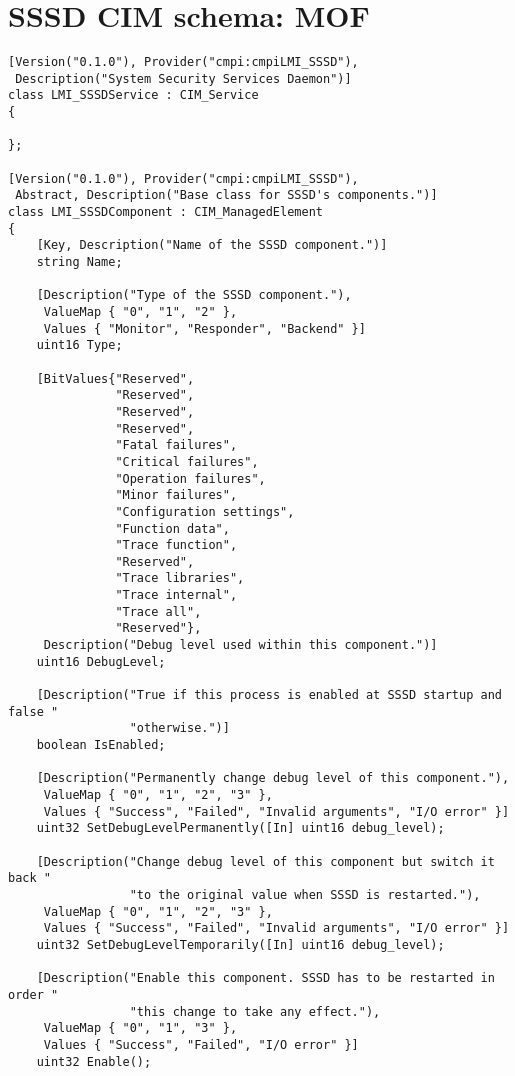 \chapter{SSSD CIM schema: MOF}
\label{appendix-mof}

\begin{lstlisting}
[Version("0.1.0"), Provider("cmpi:cmpiLMI_SSSD"),
 Description("System Security Services Daemon")]
class LMI_SSSDService : CIM_Service
{

};

[Version("0.1.0"), Provider("cmpi:cmpiLMI_SSSD"),
 Abstract, Description("Base class for SSSD's components.")]
class LMI_SSSDComponent : CIM_ManagedElement
{
    [Key, Description("Name of the SSSD component.")]
    string Name;

    [Description("Type of the SSSD component."),
     ValueMap { "0", "1", "2" },
     Values { "Monitor", "Responder", "Backend" }]
    uint16 Type;

    [BitValues{"Reserved",
               "Reserved",
               "Reserved",
               "Reserved",
               "Fatal failures",
               "Critical failures",
               "Operation failures",
               "Minor failures",
               "Configuration settings",
               "Function data",
               "Trace function",
               "Reserved",
               "Trace libraries",
               "Trace internal",
               "Trace all",
               "Reserved"},
     Description("Debug level used within this component.")]
    uint16 DebugLevel;

    [Description("True if this process is enabled at SSSD startup and false "
                 "otherwise.")]
    boolean IsEnabled;

    [Description("Permanently change debug level of this component."),
     ValueMap { "0", "1", "2", "3" },
     Values { "Success", "Failed", "Invalid arguments", "I/O error" }]
    uint32 SetDebugLevelPermanently([In] uint16 debug_level);
    
    [Description("Change debug level of this component but switch it back "
                 "to the original value when SSSD is restarted."),
     ValueMap { "0", "1", "2", "3" },
     Values { "Success", "Failed", "Invalid arguments", "I/O error" }]
    uint32 SetDebugLevelTemporarily([In] uint16 debug_level);

    [Description("Enable this component. SSSD has to be restarted in order "
                 "this change to take any effect."),
     ValueMap { "0", "1", "3" },
     Values { "Success", "Failed", "I/O error" }]
    uint32 Enable();
    

\end{lstlisting}
